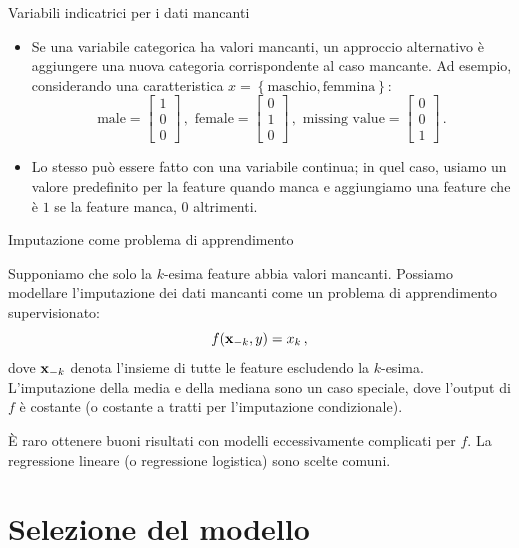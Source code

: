 \documentclass[12pt,aspectratio=169]{beamer}
\begin{document}
\begin{frame}{Variabili indicatrici per i dati mancanti}
	
	\begin{itemize}
		\item Se una variabile categorica ha valori mancanti, un approccio alternativo è aggiungere una nuova categoria corrispondente al caso mancante. Ad esempio, considerando una caratteristica $x = \left\{ \text{maschio}, \text{femmina} \right\}$:
		$$
		\text{male} = \begin{bmatrix}
			1 \\ 0 \\ 0
		\end{bmatrix} \,, \,\,
		\text{female} = \begin{bmatrix}
			0 \\ 1 \\ 0
		\end{bmatrix} \,, \,\,
		\text{missing value} = \begin{bmatrix}
			0 \\ 0 \\ 1
		\end{bmatrix} \,.
		$$
		\item Lo stesso può essere fatto con una variabile continua; in quel caso, usiamo un valore predefinito per la feature quando manca e aggiungiamo una feature che è $1$ se la feature manca, $0$ altrimenti.
	\end{itemize}
	
\end{frame}

\begin{frame}{Imputazione come problema di apprendimento}
	
	Supponiamo che solo la $k$-esima feature abbia valori mancanti. Possiamo modellare l'imputazione dei dati mancanti come un problema di apprendimento supervisionato:
	$$
	f(\boldsymbol{\mathbf{x}}_{-k}, y) = x_k \,,
	$$
	dove $\boldsymbol{\mathbf{x}}_{-k}$ denota l'insieme di tutte le feature escludendo la $k$-esima. L'imputazione della media e della mediana sono un caso speciale, dove l'output di $f$ è costante (o costante a tratti per l'imputazione condizionale).
	
	È raro ottenere buoni risultati con modelli eccessivamente complicati per $f$. La regressione lineare (o regressione logistica) sono scelte comuni.
	
\end{frame}

\section{Selezione del modello}
\end{document}
